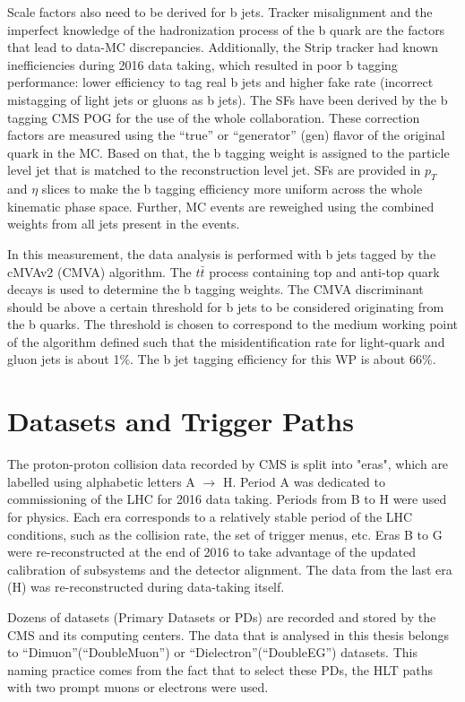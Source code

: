 Scale factors also need to be derived for b jets. Tracker misalignment and the imperfect knowledge of the hadronization process of the b quark are the factors that lead to data-MC discrepancies. Additionally, the Strip tracker had known inefficiencies during 2016 data taking, which resulted in poor b tagging performance: lower efficiency to tag real b jets and higher fake rate (incorrect mistagging of light jets or gluons as b jets). The SFs have been derived by the b tagging CMS POG for the use of the whole collaboration. These correction factors are measured using the ``true'' or ``generator'' (gen) flavor of the original quark in the MC. Based on that, the b tagging weight is assigned to the particle level jet that is matched to the reconstruction level jet. SFs are provided in $p_T$ and $\eta$ slices to make the b tagging efficiency more uniform across the whole kinematic phase space. Further, MC events are reweighed using the combined weights from all jets present in the events. 

In this measurement, the data analysis is performed with b jets tagged by the cMVAv2 (CMVA) algorithm. The $t\bar{t}$ process containing top and anti-top quark decays is used to determine the b tagging weights. The CMVA discriminant should be above a certain threshold for b jets to be considered originating from the b quarks. The threshold is chosen to correspond to the medium working point of the algorithm defined such that the misidentification rate for light-quark and gluon jets is about 1$\%$.  The b jet tagging efficiency for this WP is about 66$\%$.


\section{Datasets and Trigger Paths}\label{sec:data_and_trigger}

The proton-proton collision data recorded by CMS is split into "eras", which are labelled using alphabetic letters A $\rightarrow $ H. Period A was dedicated to commissioning of the LHC for 2016 data taking. Periods from B to H were used for physics. Each era corresponds to a relatively stable period of the LHC conditions, such as the collision rate, the set of trigger menus, etc. Eras B to G were re-reconstructed at the end of 2016 to take advantage of the updated calibration of subsystems and the detector alignment. The data from the last era (H) was re-reconstructed during data-taking itself. 

Dozens of datasets (Primary Datasets or PDs) are recorded and stored by the CMS and its computing centers. The data that is analysed in this thesis belongs to ``Dimuon''(``DoubleMuon'') or ``Dielectron''(``DoubleEG'') datasets. This naming practice comes from the fact that to select these PDs, the HLT paths with two prompt muons or electrons were used. 

